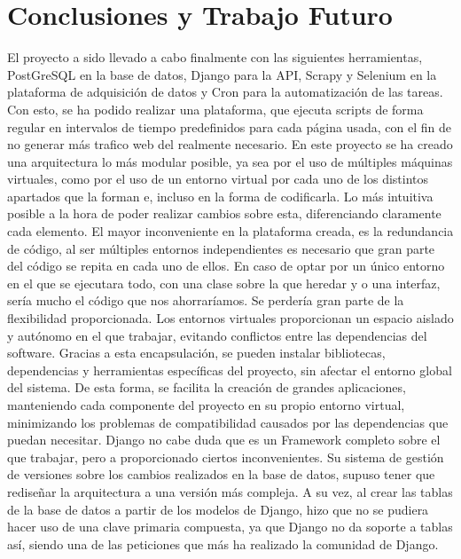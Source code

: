 \chapter[Conclusiones y Trabajo Futuro]{Conclusiones y Trabajo Futuro}
\label{Chap6}

El proyecto a sido llevado a cabo finalmente con las siguientes herramientas, PostGreSQL en la base de datos, Django para la API, Scrapy y Selenium en la plataforma de adquisición de datos y Cron para la automatización de las tareas. Con esto, se ha podido realizar una plataforma, que ejecuta scripts de forma regular en intervalos de tiempo predefinidos para cada página usada, con el fin de no generar más trafico web del realmente necesario.\newline
\newline
En este proyecto se ha creado una arquitectura lo más modular posible, ya sea por el uso de múltiples máquinas virtuales, como por el uso de un entorno virtual por cada uno de los distintos apartados que la forman e, incluso en la forma de codificarla. Lo más intuitiva posible a la hora de poder realizar cambios sobre esta, diferenciando claramente cada elemento.\newline
\newline
El mayor inconveniente en la plataforma creada, es la redundancia de código, al ser múltiples entornos independientes es necesario que gran parte del código se repita en cada uno de ellos. En caso de optar por un único entorno en el que se ejecutara todo, con una clase sobre la que heredar y o una interfaz, sería mucho el código que nos ahorraríamos. Se perdería gran parte de la flexibilidad proporcionada.\newline
\newline
Los entornos virtuales proporcionan un espacio aislado y autónomo en el que trabajar, evitando conflictos entre las dependencias del software. Gracias a esta encapsulación, se pueden instalar bibliotecas, dependencias y herramientas específicas del proyecto, sin afectar el entorno global del sistema. De esta forma, se facilita la creación de grandes aplicaciones, manteniendo cada componente del proyecto en su propio entorno virtual, minimizando los problemas de compatibilidad causados por las dependencias que puedan necesitar.\newline
\newline
Django no cabe duda que es un Framework completo sobre el que trabajar, pero a proporcionado ciertos inconvenientes. Su sistema de gestión de versiones sobre los cambios realizados en la base de datos, supuso tener que rediseñar la arquitectura a una versión más compleja. A su vez, al crear las tablas de la base de datos a partir de los modelos de Django, hizo que no se pudiera hacer uso de una clave primaria compuesta, ya que Django no da soporte a tablas así, siendo una de las peticiones que más ha realizado la comunidad de Django.\newline
